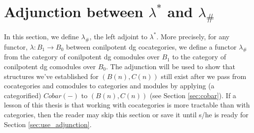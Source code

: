 \section{Adjunction between $\lambda^*$ and $\lambda_\#$}\label{sec:cobar_ref}
In this section, we define $\lambda_\#$, 
the left adjoint to $\lambda^*$. 
More precisely, for any functor, $\lambda:
B_1 \to B_0$ between 
conilpotent dg cocategories, 
we define a functor 
$\lambda_\#$ from the category of 
conilpotent dg comodules 
over $B_1$ to the category of 
conilpotent dg 
comodules over $B_0$.
The adjunction will be used to show 
that structures we've established 
for $(B(n), C(n))$ still exist 
after we pass from cocategories and 
comodules to categories and modules
by applying (a categorified) $Cobar(-)$ 
to $(B(n), C(n))$ (see Section 
\ref{sec:cobar}). If a lesson 
of this thesis is that working with
cocategories is more tractable 
than with categories, then the reader 
may skip this section or save it until 
s/he is ready for Section 
\ref{sec:use_adjunction}.
%

%
